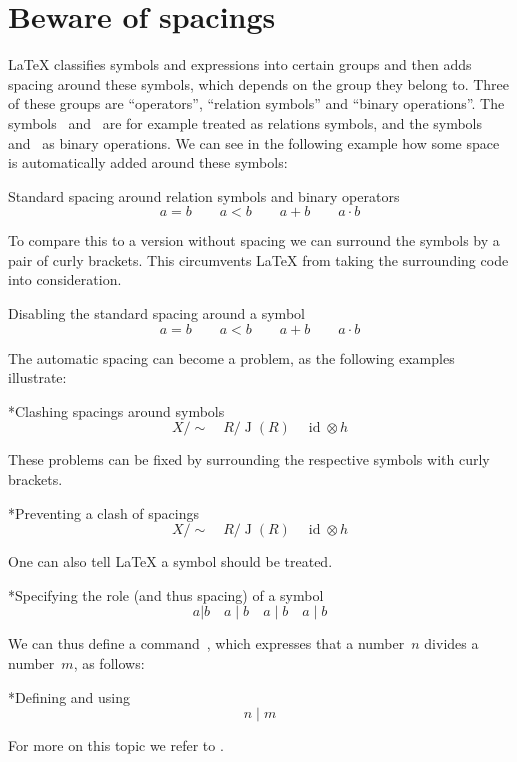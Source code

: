 \section{Beware of spacings}


{\LaTeX} classifies symbols and expressions into certain groups and then adds spacing around these symbols, which depends on the group they belong to.
Three of these groups are \enquote{operators}, \enquote{relation symbols} and \enquote{binary operations}.
The symbols~\inlinecode{=} and~\inlinecode{<} are for example treated as relations symbols, and the symbols~\inlinecode{+} and~ as binary operations.
We can see in the following example how some space is automatically added around these symbols:
\begin{showlatex}{Standard spacing around relation symbols and binary operators}
\[
  a = b  \qquad  a < b  \qquad  a + b  \qquad  a \cdot b
\]
\end{showlatex}
To compare this to a version without spacing we can surround the symbols by a pair of curly brackets.
This circumvents {\LaTeX} from taking the surrounding code into consideration.
\begin{showlatex}{Disabling the standard spacing around a symbol}
\[
  a {=} b   \qquad  a {<} b  \qquad  a {+} b  \qquad  a {\cdot} b
\]
\end{showlatex}
The automatic spacing can become a problem, as the following examples illustrate:
\begin{showlatex}*{Clashing spacings around symbols}
\[
  X/\sim
  \quad
  R/\operatorname{J}(R)
  \quad
  \operatorname{id} \otimes h
\]
\end{showlatex}
These problems can be fixed by surrounding the respective symbols with curly brackets.
\begin{showlatex}*{Preventing a clash of spacings}
\[
  X/{\sim}
  \quad
  R/{\operatorname{J}(R)}
  \quad
  {\operatorname{id}} \otimes h
\]
\end{showlatex}
One can also tell {\LaTeX} a symbol should be treated.
\begin{showlatex}*{Specifying the role (and thus spacing) of a symbol}
\[
  a | b
  \quad
  a \mathop{|} b
  \quad
  a \mathrel{|} b
  \quad
  a \mathbin{|} b
\]
\end{showlatex}
We can thus define a command~, which expresses that a number~$n$ divides a number~$m$, as follows:
\begin{showlatex}*{Defining and using }
\newcommand{\divides}{\mathrel{|}}
\[
  n \divides m
\]
\end{showlatex}
For more on this topic we refer to \cite{tex_binrel}.





